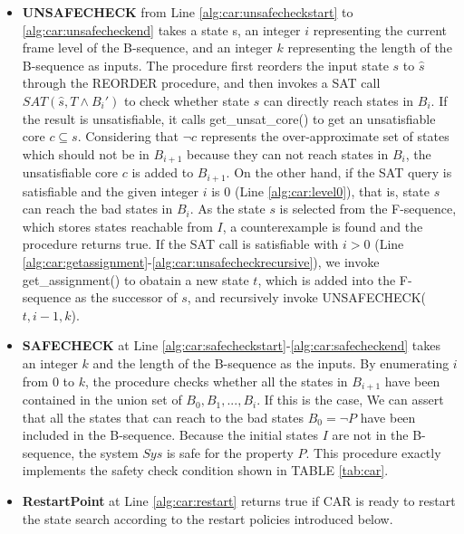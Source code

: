 \begin{itemize}
    \item \textbf{UNSAFECHECK} from Line \ref{alg:car:unsafecheckstart} to \ref{alg:car:unsafecheckend} takes a state s, an integer $i$ representing the current frame level of the B-sequence, and an integer $k$ representing the length of the B-sequence as inputs. The procedure first reorders the input state $s$ to $\hat{s}$ through the REORDER procedure, and then invokes a SAT call $\mathit{SAT}(\hat{s},T\wedge {B_{i}}')$ to check whether state $s$ can directly reach states in $B_{i}$. If the result is unsatisfiable, it calls get\_unsat\_core() to get an unsatisfiable core $c \subseteq s$. Considering that $\neg c$ represents the over-approximate set of states which should not be in $B_{i+1}$ because they can not reach states in $B_{i}$, the unsatisfiable core $c$ is added to $B_{i+1}$. On the other hand, if the SAT query is satisfiable and the given integer $i$ is 0 (Line \ref{alg:car:level0}), that is, state $s$ can reach the bad states in $B_{i}$. As the state $s$ is selected from the F-sequence, which stores states reachable from $I$, a counterexample is found and the procedure returns true. If the SAT call is satisfiable with $i>0$ (Line \ref{alg:car:getassignment}-\ref{alg:car:unsafecheckrecursive}), we invoke get\_assignment() to obatain a new state $t$, which is added into the F-sequence as the successor of $s$, and recursively invoke UNSAFECHECK($t,i-1,k$). 
    \item \textbf{SAFECHECK} at Line \ref{alg:car:safecheckstart}-\ref{alg:car:safecheckend} takes an integer $k$ and the length of the B-sequence as the inputs. By enumerating $i$ from $0$ to $k$, the procedure checks whether all the states in $B_{i+1}$ have been contained in the union set of $B_{0},B_{1},...,B_{i}$. If this is the case, We can assert that all the states that can reach to the bad states $B_{0}=\neg P$ have been included in the B-sequence. Because the initial states $I$ are not in the B-sequence, the system $Sys$ is safe for the property $P$. This procedure exactly implements the safety check condition shown in TABLE \ref{tab:car}.
    \item \textbf{RestartPoint} at Line \ref{alg:car:restart} returns true if CAR is ready to restart the state search according to the restart policies introduced below.
    

\end{itemize}

